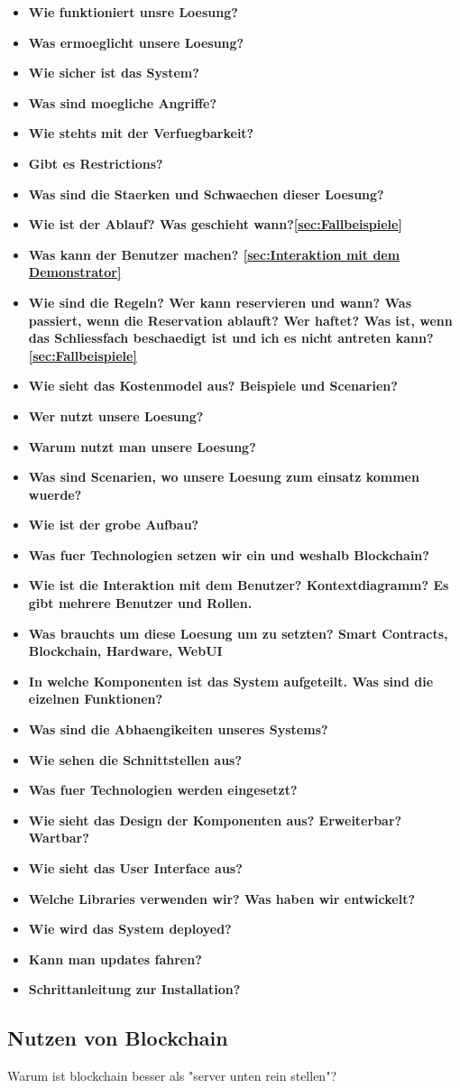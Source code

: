 \begin{itemize}
    \item \textbf{ Wie funktioniert unsre Loesung? }
    \item \textbf{ Was ermoeglicht unsere Loesung? }
    \item \textbf{ Wie sicher ist das System? }
    \item \textbf{ Was sind moegliche Angriffe? }
    \item \textbf{ Wie stehts mit der Verfuegbarkeit?}
    \item \textbf{ Gibt es Restrictions?}
    \item \textbf{ Was sind die Staerken und Schwaechen dieser Loesung? }
    \item \textbf{ Wie ist der Ablauf? Was geschieht wann?\ref{sec:Fallbeispiele}}
    \item \textbf{ Was kann der Benutzer machen? \ref{sec:Interaktion mit dem Demonstrator}}
    \item \textbf{ Wie sind die Regeln? Wer kann reservieren und wann? Was passiert, wenn die Reservation ablauft? Wer haftet? Was ist, wenn das Schliessfach beschaedigt ist und ich es nicht antreten kann?\ref{sec:Fallbeispiele}}
    \item \textbf{ Wie sieht das Kostenmodel aus? Beispiele und Scenarien?}
    \item \textbf{ Wer nutzt unsere Loesung? }
    \item \textbf{ Warum nutzt man unsere Loesung?}
    \item \textbf{ Was sind Scenarien, wo unsere Loesung zum einsatz kommen wuerde?}
    \item \textbf{ Wie ist der grobe Aufbau?}
    \item \textbf{ Was fuer Technologien setzen wir ein und weshalb Blockchain?}
    \item \textbf{ Wie ist die Interaktion mit dem Benutzer? Kontextdiagramm? Es gibt mehrere Benutzer und Rollen.}
    \item \textbf{ Was brauchts um diese Loesung um zu setzten? Smart Contracts, Blockchain, Hardware, WebUI }
    \item \textbf{ In welche Komponenten ist das System aufgeteilt. Was sind die eizelnen Funktionen?}
    \item \textbf{ Was sind die Abhaengikeiten unseres Systems?}
    \item \textbf{ Wie sehen die Schnittstellen aus?} 
    \item \textbf{ Was fuer Technologien werden eingesetzt?} 
    \item \textbf{ Wie sieht das Design der Komponenten aus? Erweiterbar? Wartbar?} 
    \item \textbf{ Wie sieht das User Interface aus?} 
    \item \textbf{ Welche Libraries verwenden wir? Was haben wir entwickelt?}
    \item \textbf{ Wie wird das System deployed?}
    \item \textbf{ Kann man updates fahren?}
    \item \textbf{ Schrittanleitung zur Installation?}
\end{itemize}

\subsection{Nutzen von Blockchain}
Warum ist blockchain besser als "server unten rein stellen"?

